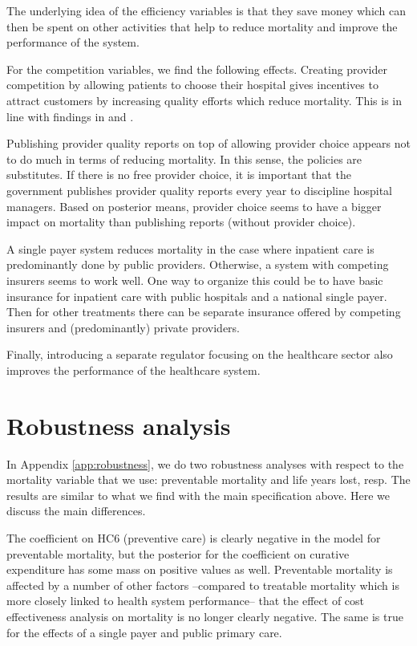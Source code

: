 \documentclass{article}
\begin{document}
The underlying idea of the efficiency variables is that they save money which can then be spent on other activities that help to reduce mortality and improve the performance of the system.

For the competition variables, we find the following effects. Creating provider competition by allowing patients to choose their hospital gives incentives to attract customers by increasing quality efforts which reduce mortality. This is in line with findings in \cite{NBERw19800} and \cite{teisberg}.

Publishing provider quality reports on top of allowing provider choice appears not to do much in terms of reducing mortality. In this sense, the policies are substitutes. If there is no free provider choice, it is important that the government publishes provider quality reports every year to discipline hospital managers. Based on posterior means, provider choice seems to have a bigger impact on mortality than publishing reports (without provider choice).

A single payer system reduces mortality in the case where inpatient care is predominantly done by public providers. Otherwise, a system with competing insurers seems to work well. One way to organize this could be to have basic insurance for inpatient care with public hospitals and a national single payer. Then for other treatments there can be separate insurance offered by competing insurers and (predominantly) private providers.

Finally, introducing a separate regulator focusing on the healthcare sector also improves the performance of the healthcare system.

\section{Robustness analysis}
\label{sec:orgc6dd814}

In Appendix \ref{app:robustness}, we do two robustness analyses with respect to the mortality variable that we use: preventable mortality and  life years lost, resp. The results are similar to what we find with the main specification above. Here we discuss the main differences.

The coefficient on HC6 (preventive care) is clearly negative in the model for preventable mortality, but the posterior for the coefficient on curative expenditure has some mass on positive values as well. Preventable mortality is affected by a number of other factors --compared to treatable mortality which is more closely linked to health system performance-- that the effect of cost effectiveness analysis on mortality is no longer clearly negative. The same is true for the effects of a single payer and public primary care.
\end{document}
